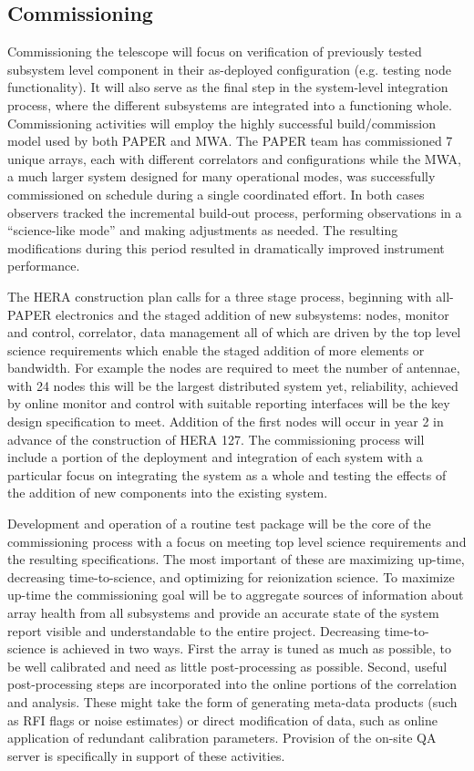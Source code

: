 \documentclass[preprint]{aastex}
\begin{document}
\vspace{-0.25in}
\subsection{Commissioning}
\vspace{-6pt}
Commissioning the telescope will focus on verification of previously tested subsystem level component in their as-deployed configuration (e.g. testing node functionality). It will also serve as the final step in the system-level integration process, where the different subsystems are integrated into a functioning whole.  Commissioning activities will employ the highly successful build/commission model used by both PAPER and MWA. The PAPER team has commissioned 7 unique arrays, each with different correlators and configurations while the MWA, a much larger system designed for many operational modes, was successfully commissioned on schedule during a single coordinated effort.
 In both cases observers tracked the incremental build-out process, performing observations in a ``science-like mode'' and making adjustments as needed. The resulting modifications during this period resulted in dramatically improved instrument performance.  

The HERA construction plan calls for a three stage process, beginning with all-PAPER electronics and the staged addition of new subsystems: nodes, monitor and control, correlator, data management all of which are driven by the top level science requirements which enable the staged addition of more elements or bandwidth. For example the nodes are required to meet the number of antennae, with 24 nodes this will be the largest distributed system yet, reliability, achieved by online monitor and control with suitable reporting interfaces will be the key design specification to meet.  Addition of the first nodes will occur in year 2 in advance of the construction of HERA 127. The commissioning process will include a portion of the deployment and integration of each system with a particular focus on integrating the system as a whole and testing the effects of the addition of new components into the existing system.  

Development and operation of a routine test package will be the core of the commissioning process with a focus on meeting top level science requirements and the resulting specifications.  The most important of these are maximizing up-time, decreasing time-to-science, and optimizing for reionization science.  To maximize up-time the commissioning goal will be to aggregate sources of information about array health from all subsystems and provide an accurate state of the system report visible and understandable to the entire project.  Decreasing time-to-science is achieved in two ways. First the array is tuned as much as possible, to be well calibrated and need as little post-processing as possible.  Second, useful post-processing steps are incorporated into the online portions of the correlation and analysis. These might take the form of generating meta-data products (such as RFI flags or noise estimates) or direct modification of data, such as online application of redundant calibration parameters.  Provision of the on-site QA server is specifically in support of these activities.
\end{document}
